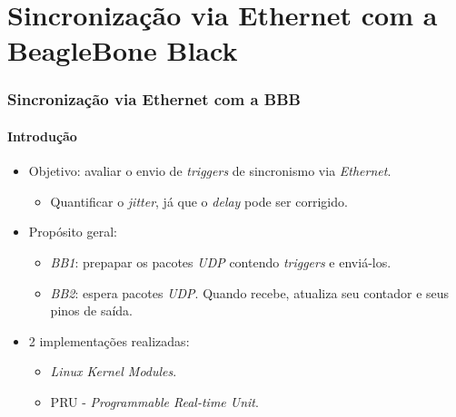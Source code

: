 \documentclass{beamer}
\begin{document}
\section {Sincronização via Ethernet com a BeagleBone Black}

\begin{frame}
\frametitle{Sincronização via Ethernet com a BBB }
\framesubtitle{Introdução}
\begin{itemize}
  \item Objetivo: avaliar o envio de \textit{triggers} de sincronismo via
  \textit{Ethernet}.
  \begin{itemize}
    \item Quantificar o \textit{jitter}, já que o \textit{delay} pode ser
    corrigido.
  \end{itemize}
  \item Propósito geral:
  \begin{itemize}
  \item \textit{BB1}: prepapar os
  pacotes \textit{UDP} contendo \textit{triggers} e enviá-los.
  
  \item \textit{BB2}: espera pacotes \textit{UDP}. Quando recebe, atualiza seu
  contador e seus pinos de saída.
  \end{itemize}
  \item 2 implementações realizadas: 
  \begin{itemize}
    \item \textit{Linux Kernel Modules}.
    \item PRU - \textit{Programmable Real-time Unit}.
  \end{itemize}
\end{itemize}
\end{frame}
\end{document}

